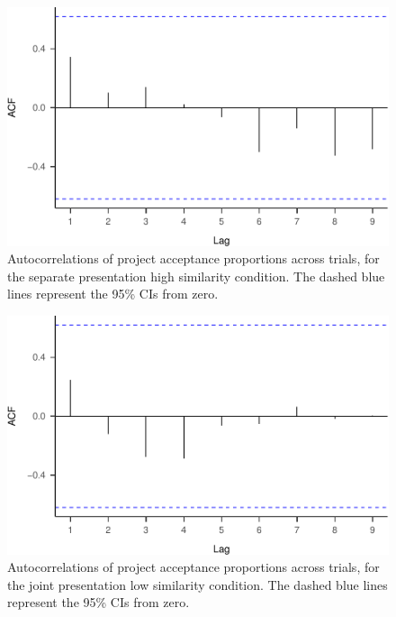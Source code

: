 \documentclass[
  english,
  man, donotrepeattitle,floatsintext]{apa7}
\begin{document}
\begin{figure}
\centering
\includegraphics{aggregation_trials_files/figure-latex/acf-separate-high-1.pdf}
\caption{\label{fig:acf-separate-high}Autocorrelations of project acceptance proportions across trials, for the separate presentation high similarity condition. The dashed blue lines represent the 95\% CIs from zero.}
\end{figure}

\begin{figure}
\centering
\includegraphics{aggregation_trials_files/figure-latex/acf-joint-low-1.pdf}
\caption{\label{fig:acf-joint-low}Autocorrelations of project acceptance proportions across trials, for the joint presentation low similarity condition. The dashed blue lines represent the 95\% CIs from zero.}
\end{figure}
\end{document}
